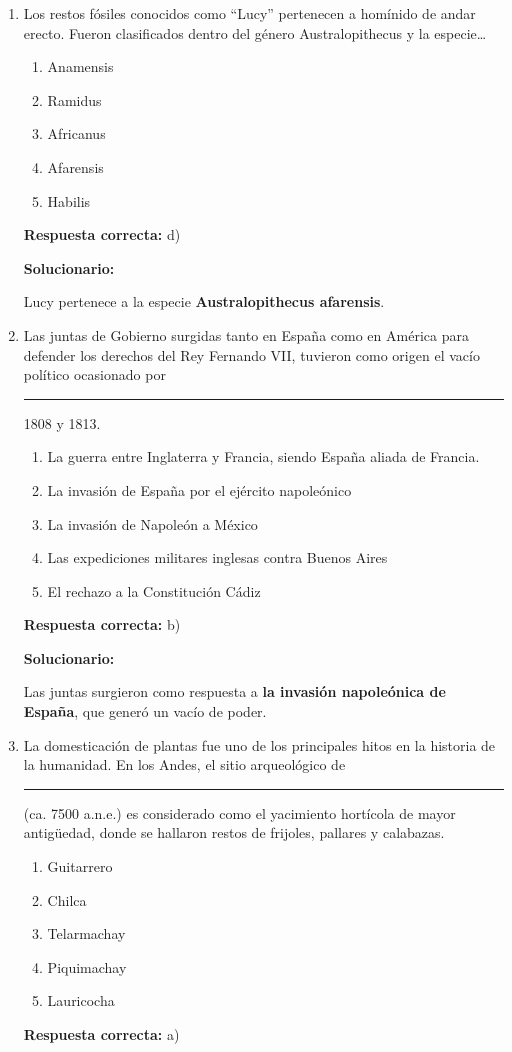 \begin{enumerate}[resume]

	
	\item Los restos fósiles conocidos como “Lucy” pertenecen a homínido de andar erecto. Fueron clasificados dentro del género Australopithecus y la especie…
	\begin{enumerate}[label=\alph*)]
		\item Anamensis
		\item Ramidus
		\item Africanus
		\item Afarensis
		\item Habilis
	\end{enumerate}
	\textbf{Respuesta correcta:} d)
	
	\vspace{2mm}
	\textbf{Solucionario:}
	
	Lucy pertenece a la especie \textbf{Australopithecus afarensis}.
	
	\vspace{6mm}
	
	\item Las juntas de Gobierno surgidas tanto en España como en América para defender los derechos del Rey Fernando VII, tuvieron como origen el vacío político ocasionado por \rule{3cm}{0.4pt} 1808 y 1813.
	\begin{enumerate}[label=\alph*)]
		\item La guerra entre Inglaterra y Francia, siendo España aliada de Francia.
		\item La invasión de España por el ejército napoleónico
		\item La invasión de Napoleón a México
		\item Las expediciones militares inglesas contra Buenos Aires
		\item El rechazo a la Constitución Cádiz
	\end{enumerate}
	\textbf{Respuesta correcta:} b)
	
	\vspace{2mm}
	\textbf{Solucionario:}
	
	Las juntas surgieron como respuesta a \textbf{la invasión napoleónica de España}, que generó un vacío de poder.
	
	\vspace{6mm}
	
	\item La domesticación de plantas fue uno de los principales hitos en la historia de la humanidad. En los Andes, el sitio arqueológico de \rule{3cm}{0.4pt} (ca. 7500 a.n.e.) es considerado como el yacimiento hortícola de mayor antigüedad, donde se hallaron restos de frijoles, pallares y calabazas.
	\begin{enumerate}[label=\alph*)]
		\item Guitarrero
		\item Chilca
		\item Telarmachay
		\item Piquimachay
		\item Lauricocha
	\end{enumerate}
	\textbf{Respuesta correcta:} a)
	

\end{enumerate}
